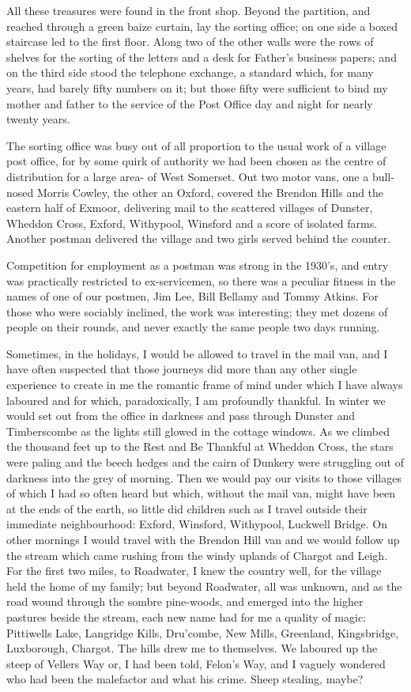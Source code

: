 All these treasures were found in the front shop. Beyond the partition, and reached through a green baize curtain, lay the sorting office; on one side a boxed staircase led to the first floor. Along two of the other walls were the rows of shelves for the sorting of the letters and a desk for Father's business papers; and on the third side stood the telephone exchange, a standard which, for many years, had barely fifty numbers on it; but those fifty were sufficient to bind my mother and father to the service of the Post Office day and night for nearly twenty years.

The sorting office was busy out of all proportion to the usual work of a village post office, for by some quirk of authority we had been chosen as the centre of distribution for a large area- of West Somerset. Out two motor vans, one a bull-nosed Morris Cowley, the other an Oxford, covered the Brendon Hills and the eastern half of Exmoor, delivering mail to the scattered villages of Dunster, Wheddon Cross, Exford, Withypool, Winsford and a score of isolated farms. Another postman delivered the village and two girls served behind the counter.

Competition for employment as a postman was strong in the 1930's, and entry was practically restricted to ex-servicemen, so there was a peculiar fitness in the names of one of our postmen, Jim Lee, Bill Bellamy and Tommy Atkins. For those who were sociably inclined, the work was interesting; they met dozens of people on their rounds, and never exactly the same people two days running.

Sometimes, in the holidays, I would be allowed to travel in the mail van, and I have often suspected that those journeys did more than any other single experience to create in me the romantic frame of mind under which I have always laboured and for which, paradoxically, I am profoundly thankful. In winter we would set out from the office in darkness and pass through Dunster and Timberscombe as the lights still glowed in the cottage windows. As we climbed the thousand feet up to the Rest and Be Thankful at Wheddon Cross, the stars were paling and the beech hedges and the cairn of Dunkery were struggling out of darkness into the grey of morning. Then we would pay our visits to those villages of which I had so often heard but which, without the mail van, might have been at the ends of the earth, so little did children such as I travel outside their immediate neighbourhood: Exford, Winsford, Withypool, Luckwell Bridge. On other mornings I would travel with the Brendon Hill van and we would follow up the stream which came rushing from the windy uplands of Chargot and Leigh. For the first two miles, to Roadwater, I knew the country well, for the village held the home of my family; but beyond Roadwater, all was unknown, and as the road wound through the sombre pine-woods, and emerged into the higher pastures beside the stream, each new name had for me a quality of magic: Pittiwells Lake, Langridge Kills, Dru'combe, New Mills, Greenland, Kingsbridge, Luxborough, Chargot. The hills drew me to themselves. We laboured up the steep of Vellers Way or, I had been told, Felon's Way, and I vaguely wondered who had been the malefactor and what his crime. Sheep stealing, maybe?

